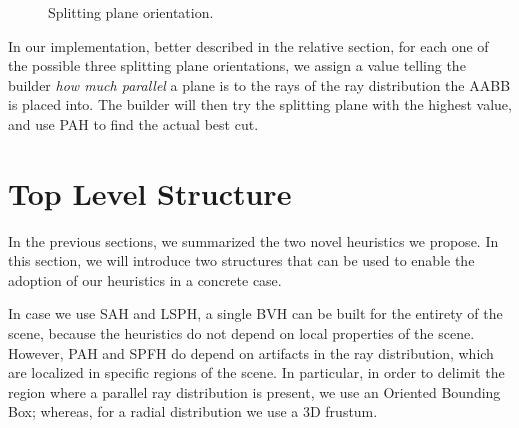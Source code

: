 \documentclass[11pt,a4paper,twocolumn]{article}
\begin{document}
\begin{figure}[H]
{    }
    \caption{Splitting plane orientation.}
    \label{fig:splitting_overlap}
\end{figure}

In our implementation, better described in the relative section, for each one of the possible three splitting plane orientations, we assign a value telling the builder \textit{how much parallel} a plane is to the rays of the ray distribution the AABB is placed into. The builder will then try the splitting plane with the highest value, and use PAH to find the actual best cut.

\section{Top Level Structure}
In the previous sections, we summarized the two novel heuristics we propose. In this section, we will introduce two structures that can be used to enable the adoption of our heuristics in a concrete case.

In case we use SAH and LSPH, a single BVH can be built for the entirety of the scene, because the heuristics do not depend on local properties of the scene. However, PAH and SPFH do depend on artifacts in the ray distribution, which are localized in specific regions of the scene. In particular, in order to delimit the region where a parallel ray distribution is present, we use an Oriented Bounding Box; whereas, for a radial distribution we use a 3D frustum. 
\end{document}
